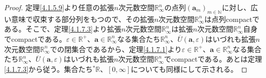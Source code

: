 \documentclass[dvipdfmx]{jsarticle}
\begin{document}
\begin{proof} 定理\ref{4.1.5.9}より任意の拡張$n$次元数空間$\mathbb{R}_{\infty}^{n}$の点列$\left( \mathbf{a}_{m} \right)_{m \in \mathbb{N}}$に対し、広い意味で収束する部分列をもつので、その拡張$n$次元数空間$\mathbb{R}_{\infty}^{n}$は点列compactである。そこで、定理\ref{4.1.7.3}より拡張$n$次元数空間$\mathbb{R}_{\infty}^{n}$は拡張$n$次元数空間$\mathbb{R}_{\infty}^{n}$自身でcompactである。$\varepsilon \in \mathbb{R}^{+}$、$\mathbf{a} \in \mathbb{R}_{\infty}^{n}$なる集合たち$\mathbb{R}_{\infty}^{n}$、$\overline{U}\left( \mathbf{a},\varepsilon \right)$はいづれも拡張$n$次元数空間$\mathbb{R}_{\infty}^{n}$での閉集合であるから、定理\ref{4.1.7.1}より$\varepsilon \in \mathbb{R}^{+}$、$\mathbf{a} \in \mathbb{R}_{\infty}^{n}$なる集合たち$\mathbb{R}_{\infty}^{n}$、$\overline{U}\left( \mathbf{a},\varepsilon \right)$はいづれも拡張$n$次元数空間$\mathbb{R}_{\infty}^{n}$でcompactである。あとは定理\ref{4.1.7.3}から従う。集合たち${}^{*}\mathbb{R}$、$[ 0,\infty]$についても同様にして示される。
\end{proof}
\end{document}
